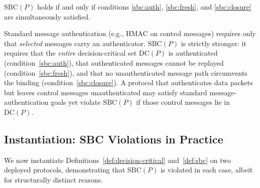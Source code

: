 \begin{definition}
$\mathrm{SBC}(P)$ holds if and only if conditions
\ref{sbc:auth}, \ref{sbc:fresh}, and \ref{sbc:closure} are simultaneously
satisfied.
\end{definition}

\begin{remark}
\label{rem:sbc-vs-auth}
Standard message authentication (e.g., HMAC on control messages)
requires only that \emph{selected} messages carry an authenticator.
$\mathrm{SBC}(P)$ is strictly stronger: it requires that the
\emph{entire} decision-critical set $\mathrm{DC}(P)$ is authenticated
(condition~\ref{sbc:auth}), that authenticated messages cannot be
replayed (condition~\ref{sbc:fresh}), and that no unauthenticated
message path circumvents the binding (condition~\ref{sbc:closure}).
A protocol that authenticates data packets but leaves control messages
unauthenticated may satisfy standard message-authentication goals yet
violate $\mathrm{SBC}(P)$ if those control messages lie in
$\mathrm{DC}(P)$.
\end{remark}

\subsection{Instantiation: SBC Violations in Practice}
\label{subsec:sbc-instantiation}

We now instantiate Definitions~\ref{def:decision-critical}
and~\ref{def:sbc} on two deployed protocols, demonstrating that
$\mathrm{SBC}(P)$ is violated in each case, albeit for structurally
distinct reasons.

